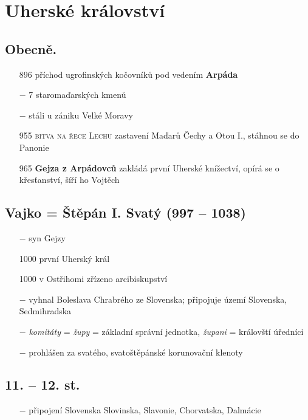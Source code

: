 \documentclass{article}
\begin{document}
\section*{Uherské království}
\subsection*{Obecně.}
\begin{itemize}
    \vspace{-0.5em}
    \setlength\itemsep{0.15em}
    \item[896] příchod ugrofinských kočovníků pod vedením \textbf{Arpáda}
    \item[$-$] 7 staromaďarských kmenů
    \item[$-$] stáli u zániku Velké Moravy
    \item[955] \textsc{bitva na řece Lechu} zastavení Maďarů Čechy a Otou I., stáhnou se do Panonie
    \item[965] \textbf{Gejza z Arpádovců} zakládá první Uherské knížectví, opírá se o křesťanství, šíří ho Vojtěch
\end{itemize}

\subsection*{Vajko = Štěpán I. Svatý (997 -- 1038)}
\begin{itemize}
    \vspace{-0.5em}
    \setlength\itemsep{0.15em}
    \item[$-$] syn Gejzy
    \item[1000] první Uherský král
    \item[1000] v Ostřihomi zřízeno arcibiskupství
    \item[$-$] vyhnal Boleslava Chrabrého ze Slovenska; připojuje území Slovenska, Sedmihradska
    \item[$-$] \textit{komitáty} = \textit{župy} = základní správní jednotka, \textit{župani} = královští úředníci
    \item[$-$] prohlášen za svatého, svatoštěpánské korunovační klenoty
\end{itemize}

\subsection*{11. -- 12. st.}
\begin{itemize}
    \vspace{-0.5em}
    \setlength\itemsep{0.15em}
    \item[$-$] připojení Slovenska Slovinska, Slavonie, Chorvatska, Dalmácie
\end{itemize}
\end{document}
